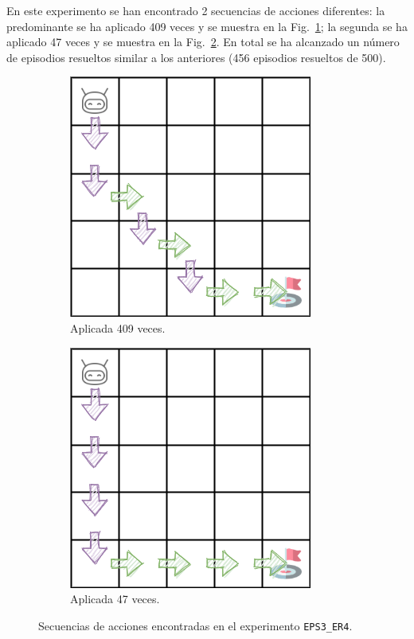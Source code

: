 En este experimento se han encontrado 2 secuencias de acciones diferentes: la predominante se ha aplicado 409 veces y se muestra en la Fig.~\ref{fig:dim5_lr0.01_ep0.3_409}; la segunda se ha aplicado 47 veces y se muestra en la Fig.~\ref{fig:dim5_lr0.01_ep0.3_47}. En total se ha alcanzado un número de episodios resueltos similar a los anteriores (456 episodios resueltos de 500).

\begin{figure}
    \centering
    \begin{subfigure}{.5\textwidth}
        \centering
        \includegraphics[scale=0.4]{cap5_experimentacion/images/dim5_lr0.01_ep0.3_409.png}
        \caption{Aplicada 409 veces.}
        \label{fig:dim5_lr0.01_ep0.3_409}
    \end{subfigure}%
    \begin{subfigure}{.5\textwidth}
        \centering
        \includegraphics[scale=0.4]{cap5_experimentacion/images/dim5_lr0.01_ep0.3_47.png}
        \caption{Aplicada 47 veces.}
        \label{fig:dim5_lr0.01_ep0.3_47}
    \end{subfigure}
    \caption{Secuencias de acciones encontradas en el experimento \texttt{EPS3\_ER4}.}
    \label{fig:dim5_lr0.01_ep0.3}
\end{figure}

